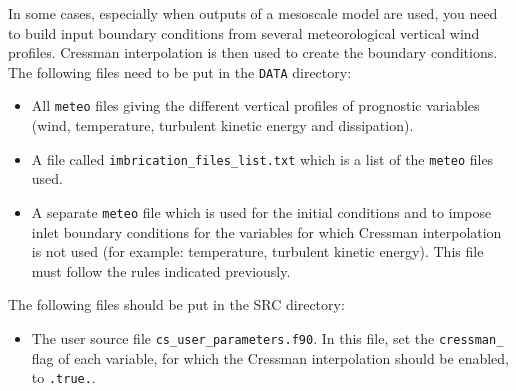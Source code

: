 
In some cases, especially when outputs of a mesoscale model are used, you
need to build input boundary conditions from several meteorological vertical
wind profiles. Cressman interpolation is then used to create the boundary
conditions. The following files need to be put in the \texttt{DATA} directory:
\begin{itemize}
\item All \texttt{meteo} files giving the different vertical profiles of
prognostic variables (wind, temperature, turbulent kinetic energy and
dissipation).
\item A file called \texttt{imbrication\_files\_list.txt} which is a list
of the \texttt{meteo} files used.
\item A separate \texttt{meteo} file which is used for the initial conditions
and to impose inlet boundary conditions for the variables for which Cressman
interpolation is not used (for example: temperature, turbulent kinetic energy).
This file must follow the rules indicated previously.
\end{itemize}
The following files should be put in the SRC directory:
\begin{itemize}
\item The user source file \texttt{cs\_user\_parameters.f90}. In this file, set
the \texttt{cressman\_} flag of each variable, for which the Cressman
interpolation should be enabled, to \texttt{.true.}.
\end{itemize}
%
